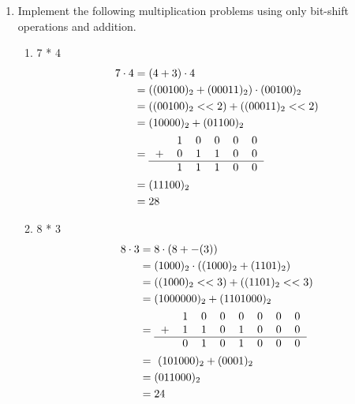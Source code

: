 \documentclass[12pt]{article}
\begin{document}
\begin{enumerate}
    \item Implement the following multiplication problems using only bit-shift operations and addition.
    \begin{enumerate}
      \item 7 * 4
      \begin{align*}
        7 \cdot 4 &= (4 + 3) \cdot 4 \\
        &= ((00100)_2 + (00011)_2) \cdot (00100)_2 \\
        &= ((00100)_2 << 2) + ((00011)_2 << 2) \\
        &= (10000)_2 + (01100)_2 \\
        &= \begin{tabular}{cccccc}
          & 1 & 0 & 0 & 0 & 0\\
        + & 0 & 1 & 1 & 0 & 0 \\
        \hline
          & 1 & 1 & 1 & 0 & 0 \\
        \end{tabular} \\
        &= (11100)_2 \\
        &= 28
      \end{align*}

      \item 8 * 3
      \begin{align*}
        8 \cdot 3 &= 8 \cdot (8 + -(3)) \\
        &= (1000)_2 \cdot ((1000)_2 + (1101)_2) \\
        &= ((1000)_2 << 3) + ((1101)_2 << 3) \\
        &= (100 0000)_2 + (110 1000)_2 \\
        &= \begin{tabular}{cccccccc}
          & 1 & 0 & 0 & 0 & 0 & 0 & 0 \\
        + & 1 & 1 & 0 & 1 & 0 & 0 & 0 \\
        \hline
          & 0 & 1 & 0 & 1 & 0 & 0 & 0 \\
        \end{tabular} \\
        &= ~(10 1000)_2 + (0001)_2 \\
        &= (01 1000)_2 \\
        &= 24
      \end{align*}


\end{enumerate}
\end{enumerate}
\end{document}
